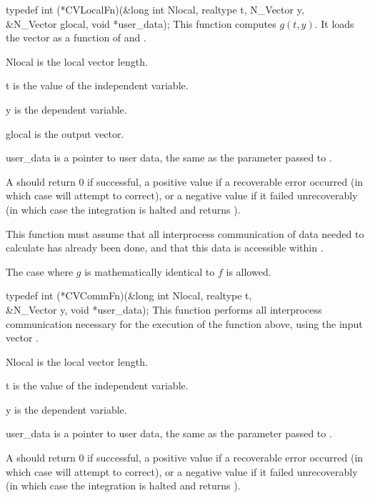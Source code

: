 {
  typedef int (*CVLocalFn)(&long int Nlocal, realtype t, N\_Vector y, \\
                           &N\_Vector glocal, void *user\_data);
}
{
  This  function computes $g(t,y)$. It loads the vector
   as a function of  and .  
}
{
  \begin{args}
  \item[Nlocal] 
    is the local vector length.
  \item[t]
    is the value of the independent variable.
  \item[y]
    is the dependent variable. 
  \item[glocal]
    is the output vector.
  \item[user\_data]
    is a pointer to user data, the same as the       
    parameter passed to .  
  \end{args}
}
{
  A  should return 0 if successful, a positive value if a recoverable
  error occurred (in which case {\cvode} will attempt to correct), or a negative 
  value if it failed unrecoverably (in which case the integration is halted and
   returns ). 
}
{
  This function must assume that all interprocess communication of data needed to 
  calculate  has already been done, and that this data is accessible within
  .

  The case where $g$ is mathematically identical to $f$ is allowed.
}
{
  typedef int (*CVCommFn)(&long int Nlocal, realtype t,  \\
                          &N\_Vector y, void *user\_data);
}
{
  This  function performs all interprocess communication necessary 
  for the execution of the  function above, using the input vector .
}
{
  \begin{args}
  \item[Nlocal] 
    is the local vector length.
  \item[t]
    is the value of the independent variable.
  \item[y]
    is the dependent variable. 
  \item[user\_data]
    is a pointer to user data, the same as the       
    parameter passed to .  
  \end{args}
}
{
  A  should return 0 if successful, a positive value if a recoverable
  error occurred (in which case {\cvode} will attempt to correct), or a negative 
  value if it failed unrecoverably (in which case the integration is halted and
   returns ). 
}
